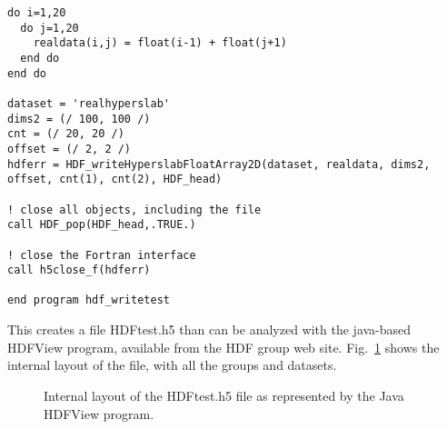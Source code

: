 \documentclass[DIV=calc, paper=letter, fontsize=11pt]{scrartcl}	 %
\begin{document}
{\begin{verbatim}
do i=1,20
  do j=1,20
    realdata(i,j) = float(i-1) + float(j+1)
  end do
end do

dataset = 'realhyperslab'
dims2 = (/ 100, 100 /)
cnt = (/ 20, 20 /)
offset = (/ 2, 2 /)
hdferr = HDF_writeHyperslabFloatArray2D(dataset, realdata, dims2, offset, cnt(1), cnt(2), HDF_head)

! close all objects, including the file
call HDF_pop(HDF_head,.TRUE.)

! close the Fortran interface
call h5close_f(hdferr)

end program hdf_writetest
\end{verbatim}}

This creates a file \textsf{HDFtest.h5} than can be analyzed with the java-based \textsf{HDFView} program, available
from the HDF group web site.  Fig.~\ref{fig:HDFView} shows the internal layout of the file, with all the groups and
datasets.

\newpage
\begin{figure}[h]
\leavevmode\centering
\epsfysize=6in
\caption{\label{fig:HDFView}Internal layout of the \textsf{HDFtest.h5} file as represented by the Java \textsf{HDFView} program.}
\end{figure}
\end{document}
